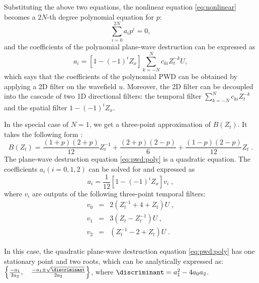 Substituting the above two equations,
the nonlinear equation \ref{eq:nonlinear} 
becomes a $2N$-th degree polynomial equation for $p$:
\begin{equation}\label{eq:pwd:poly}
\sum_{i=0}^{2N}a_ip^i=0,
\end{equation}
and the coefficients of the polynomial plane-wave destruction
can be expressed as
\begin{equation}
a_i=[1-(-1)^iZ_x]\sum_{k=-N}^Nc_{ki}Z_t^{-k}U,
\end{equation}
which says that the coefficients of the polynomial PWD
can be obtained by applying a 2D filter on the wavefield $u$.
Moreover, the 2D filter can be decoupled into the cascade of
two 1D directional filters:
the temporal filter $\displaystyle{\sum_{k=-N}^Nc_{ki}Z_t^{-k}}$ 
and the spatial filter $1-(-1)^iZ_x$.

In the special case of $N=1$,
we get a three-point approximation of $B(Z_t)$.
It takes the following form \cite[]{fomel:1946}: 
\begin{equation}
B(Z_t) = \frac{(1+p)(2+p)}{12}Z_t^{-1}+\frac{(2+p)(2-p)}{6}
+\frac{(1-p)(2-p)}{12}Z_t\;.
\end{equation}
The plane-wave destruction equation \ref{eq:pwd:poly} is a quadratic equation. 
The coefficients $a_i(i=0,1,2)$ can be solved for and expressed as
\begin{equation}
a_i=\frac{1}{12}[1-(-1)^iZ_x]v_i\;,
\end{equation}
where $v_i$ are outputs of the following three-point temporal filters:
\begin{eqnarray}
\label{eq:temp30}
v_0 &=& 2(Z_t^{-1}+4+Z_t)U\;, \\
v_1 &=& 3(Z_t-Z_t^{-1})U\;, \\
\label{eq:temp32}
v_2 &=& (Z_t^{-1}-2+Z_t)U\;.
\end{eqnarray}


In this case, 
the quadratic plane-wave destruction equation \ref{eq:pwd:poly} 
has one stationary point and two roots, 
which can be analytically expressed as:
$\left\{
 \frac{-a_1}{2a_2},\quad
 \frac{-a_1\pm\sqrt{\discriminant}}{2a_2}
\right\}
$, where $\discriminant=a_1^2-4a_0a_2$.




